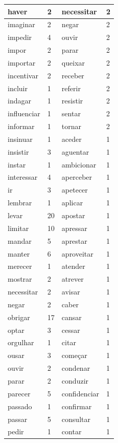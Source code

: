 \documentclass[output=paper,colorlinks,citecolor=brown]{langscibook}
\begin{document}
\begin{longtable}{ p{3cm} | p{1cm} | p{3cm} | p{1cm} }
			haver & 2 & necessitar & 2\\\hline
			imaginar & 2 & negar & 2\\\hline
			impedir & 4 & ouvir & 2\\\hline
			impor & 2 & parar & 2\\\hline
			importar & 2 & queixar & 2\\\hline
			incentivar & 2 & receber & 2\\\hline
			incluir & 1 & referir & 2\\\hline
			indagar & 1 & resistir & 2\\\hline
			influenciar & 1 & sentar & 2\\\hline
			informar & 1 & tornar & 2\\\hline
			insinuar & 1 & aceder & 1\\\hline
			insistir & 3 & aguentar & 1\\\hline
			instar & 1 & ambicionar & 1\\\hline
			interessar & 4 & aperceber & 1\\\hline
			ir & 3 & apetecer & 1\\\hline
			lembrar & 1 & aplicar & 1\\\hline
			levar & 20 & apostar & 1\\\hline
			limitar & 10 & apressar & 1\\\hline
			mandar & 5 & aprestar & 1\\\hline
			manter & 6 & aproveitar & 1\\\hline
			merecer & 1 & atender & 1\\\hline
			mostrar & 2 & atrever & 1\\\hline
			necessitar & 2 & avisar & 1\\\hline
			negar & 2 & caber & 1\\\hline
			obrigar & 17 & cansar & 1\\\hline
			optar & 3 & cessar & 1\\\hline
			orgulhar & 1 & citar & 1\\\hline
			ousar & 3 & começar & 1\\\hline
			ouvir & 2 & condenar & 1\\\hline
			parar & 2 & conduzir & 1\\\hline
			parecer & 5 & confidenciar & 1\\\hline
			passado & 1 & confirmar & 1\\\hline
			passar & 5 & consultar & 1\\\hline
			pedir & 1 & contar & 1\\\hline

\end{longtable}
\end{document}
